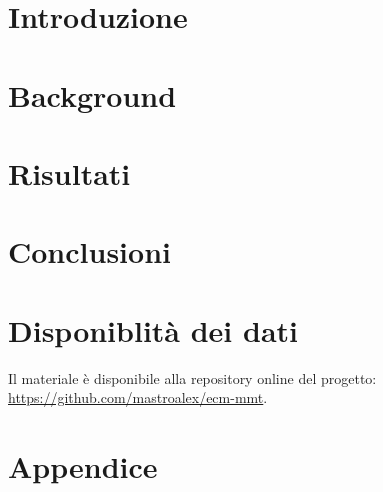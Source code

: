 \section{Introduzione}

\textcolor{blue}{\lipsum[1]}

\section{Background}
\textcolor{blue}{\lipsum[1-4]}



\section{Risultati}

\textcolor{blue}{\lipsum[1-4]}





\section{Conclusioni}

\textcolor{blue}{\lipsum[1-2]}


\raggedbottom


\raggedbottom
\pagebreak
\section*{Disponiblità dei dati}

Il materiale è disponibile alla repository online del progetto: \url{https://github.com/mastroalex/ecm-mmt}.

\printbibliography[title=Riferimenti]

\clearpage
\onecolumn
\section*{Appendice}


